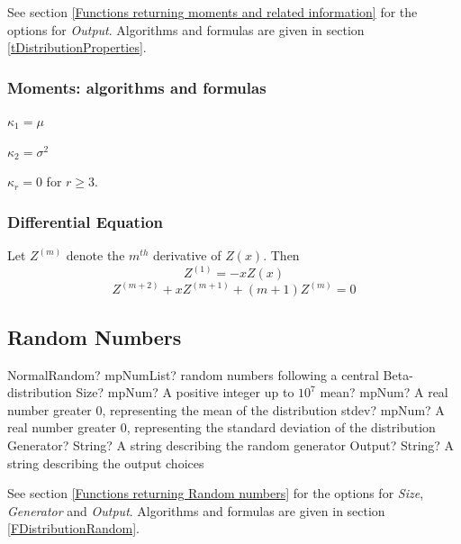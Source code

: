 \vspace{0.3cm}

See section \ref{Functions returning moments and related information} for the options for {\itshape\sffamily Output}. Algorithms and formulas are given in section \ref{tDistributionProperties}.




\subsubsection{Moments: algorithms and formulas}
$\kappa_1 = \mu$

$\kappa_2 = \sigma^2$

$\kappa_r = 0$ for $r \geq 3$.

\subsubsection{Differential Equation}
\label{Differential Equation}
Let $Z^{(m)}$ denote the $m^{th}$ derivative of $Z(x)$. Then \citep{abramowitz_handbook_1970}
\begin{equation}
	Z^{(1)} = -x Z(x)
\end{equation}
\begin{equation}
	Z^{(m+2)} +xZ^{(m+1)} + (m+1)Z^{(m)}  = 0
\end{equation}




\subsection{Random Numbers}
\label{NormalDistributionRandom}


\begin{mpFunctionsExtract}
	\mpFunctionFiveNotImplemented
	{NormalRandom? mpNumList? random numbers following a central Beta-distribution}
	{Size? mpNum? A positive integer up to $10^7$}
	{mean? mpNum? A real number greater 0, representing the mean of the distribution}
	{stdev? mpNum? A real number greater 0, representing the standard deviation of the distribution}
	{Generator? String? A string describing the random generator}
	{Output? String? A string describing the output choices}
\end{mpFunctionsExtract}

\vspace{0.3cm}

See section \ref{Functions returning Random numbers} for the options for  {\itshape\sffamily Size},  {\itshape\sffamily Generator} and {\itshape\sffamily Output}. Algorithms and formulas are given in section \ref{FDistributionRandom}.


